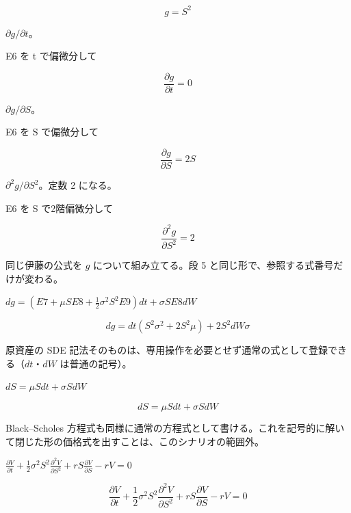 \documentclass[dvipdfmx,a4paper,11pt]{jsarticle}
\begin{document}
\begin{equation}
  g = S^2
  \label{eq:E6}
\end{equation}

$\partial g/\partial t$。

E6 を t で偏微分して

\begin{equation}
  \frac{\partial g}{\partial t} = 0
  \label{eq:E7}
\end{equation}

$\partial g/\partial S$。

E6 を S で偏微分して

\begin{equation}
  \frac{\partial g}{\partial S} = 2 S
  \label{eq:E8}
\end{equation}

$\partial^2 g/\partial S^2$。定数 2 になる。

E6 を S で2階偏微分して

\begin{equation}
  \frac{\partial^{2} g}{\partial S^{2}} = 2
  \label{eq:E9}
\end{equation}

同じ伊藤の公式を $g$ について組み立てる。段 5 と同じ形で、参照する式番号だけが変わる。

$dg = (E7 + \mu S E8 + \frac{1}{2}\sigma^2 S^2 E9) dt + \sigma S E8 dW$

\begin{equation}
  dg=dt \left(S^2 \sigma^2+2 S^2 \mu\right)+2 S^2 dW \sigma
  \label{eq:E10}
\end{equation}

原資産の SDE 記法そのものは、専用操作を必要とせず通常の式として登録できる（$dt$・$dW$ は普通の記号）。

$dS = \mu S dt + \sigma S dW$

\begin{equation}
  dS = \mu S dt + \sigma S dW
  \label{eq:E11}
\end{equation}

Black–Scholes 方程式も同様に通常の方程式として書ける。これを記号的に解いて閉じた形の価格式を出すことは、このシナリオの範囲外。

$\frac{\partial V}{\partial t} + \frac{1}{2}\sigma^2 S^2 \frac{\partial^2 V}{\partial S^2} + r S \frac{\partial V}{\partial S} - r V = 0$

\begin{equation}
  \frac{\partial V}{\partial t} + \frac{1}{2}\sigma^2 S^2 \frac{\partial^2 V}{\partial S^2} + r S \frac{\partial V}{\partial S} - r V = 0
  \label{eq:E12}
\end{equation}
\end{document}
